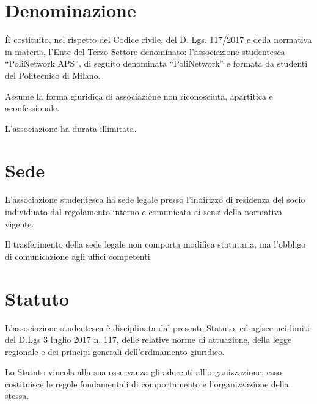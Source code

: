\documentclass[legalpaper, 11pt]{exam}
\let\tempone\enumerate
\let\temptwo\endenumerate
\renewenvironment{enumerate}{\tempone\addtolength{\itemsep}{-0.45\baselineskip}}{\temptwo}
\begin{document}
{



\begin{center}

\end{center}




\section{Denominazione}
\begin{enumerate}
 \item È costituito, nel rispetto del Codice civile, del D. Lgs. 117/2017 e della normativa in materia, l’Ente del Terzo Settore denominato: l’associazione studentesca “PoliNetwork APS”, di seguito denominata “PoliNetwork” e formata da studenti del Politecnico di Milano.
 \item Assume la forma giuridica di associazione non riconosciuta, apartitica e aconfessionale.
 \item L'associazione ha durata illimitata.
\end{enumerate}

\section{Sede}
\begin{enumerate}
 \item L’associazione studentesca ha sede legale presso l’indirizzo di residenza del socio individuato dal regolamento interno e comunicata ai sensi della normativa vigente.
\item Il trasferimento della sede legale non comporta modifica statutaria, ma l’obbligo di comunicazione agli uffici competenti.
\end{enumerate}

\section{Statuto}
\begin{enumerate}
 \item L’associazione studentesca è disciplinata dal presente Statuto, ed agisce nei limiti del D.Lgs 3 luglio 2017 n. 117, delle relative norme di attuazione, della legge regionale e dei principi generali dell’ordinamento giuridico.
 \item Lo Statuto vincola alla sua osservanza gli aderenti all’organizzazione; esso costituisce le regole fondamentali di comportamento e l’organizzazione della stessa.
\end{enumerate}

}
\end{document}
